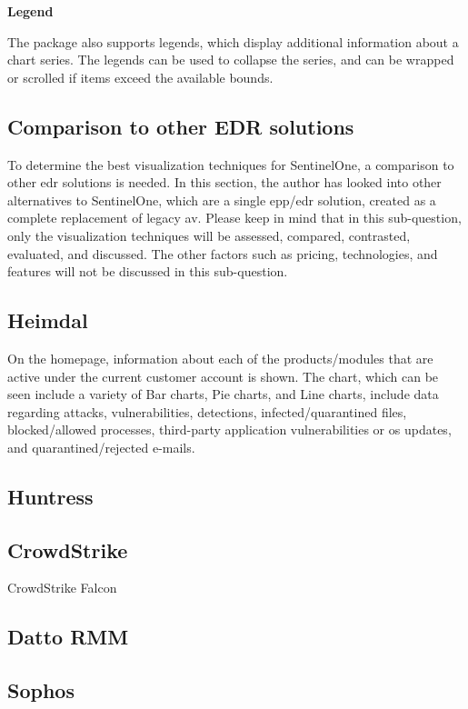 \begin{multicols}{2}
      \textbf{Legend}

      The package also supports legends, which display additional information about a chart series. The legends can be used to
      collapse the series, and can be wrapped or scrolled if items exceed the available bounds.

      \subsection{Comparison to other EDR solutions}
      To determine the best visualization techniques for SentinelOne, a comparison to other \acrshort{edr} solutions is needed.
      In this section, the author has looked into other alternatives to SentinelOne, which are a single \acrshort{epp}/\acrshort{edr}
      solution, created as a complete replacement of legacy \acrshort{av}. Please keep in mind that in this sub-question, only the
      visualization techniques will be assessed, compared, contrasted, evaluated, and discussed. The other factors such as pricing,
      technologies, and features will not be discussed in this sub-question.

      \subsection{Heimdal\textregistered}

      On the homepage, information about each of the products/modules that are active under the current customer account is shown. The
      chart, which can be seen include a variety of Bar charts, Pie charts, and Line charts, include data regarding attacks,
      vulnerabilities, detections, infected/quarantined files, blocked/allowed processes, third-party application vulnerabilities or
      \acrshort{os} updates, and quarantined/rejected e-mails.

      \subsection{Huntress}
      \subsection{CrowdStrike}
      CrowdStrike Falcon
      \subsection{Datto RMM}
      \subsection{Sophos}

\end{multicols}
